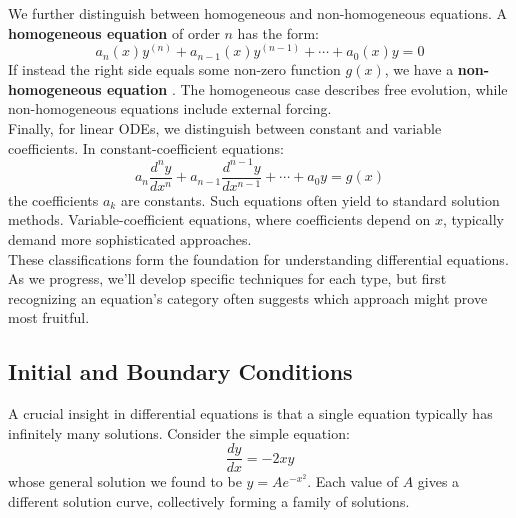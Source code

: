 \noindent We further distinguish between homogeneous and non-homogeneous equations. A \textbf{homogeneous equation}  of order $n$ has the form:
\[
a_n(x)y^{(n)} + a_{n-1}(x)y^{(n-1)} + \cdots + a_0(x)y = 0
\]
If instead the right side equals some non-zero function $g(x)$, we have a \textbf{non-homogeneous equation} . The homogeneous case describes free evolution, while non-homogeneous equations include external forcing. \\

\noindent Finally, for linear ODEs, we distinguish between constant and variable coefficients. In constant-coefficient equations:
\[
a_n\frac{d^n y}{dx^n} + a_{n-1}\frac{d^{n-1}y}{dx^{n-1}} + \cdots + a_0y = g(x)
\]
the coefficients $a_k$ are constants. Such equations often yield to standard solution methods. Variable-coefficient equations, where coefficients depend on $x$, typically demand more sophisticated approaches. \\

\noindent These classifications form the foundation for understanding differential equations. As we progress, we'll develop specific techniques for each type, but first recognizing an equation's category often suggests which approach might prove most fruitful.

\subsection*{Initial and Boundary Conditions}  

\noindent A crucial insight in differential equations is that a single equation typically has infinitely many solutions. Consider the simple equation:
\[
\frac{dy}{dx} = -2xy
\]
whose general solution we found to be $y = Ae^{-x^2}$. Each value of $A$ gives a different solution curve, collectively forming a family of solutions. \\

